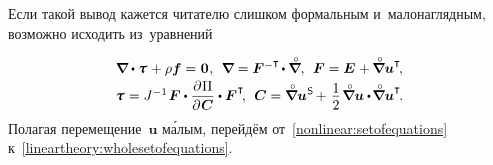 \begin{otherlanguage}{russian}

Если такой вывод кажется читателю слишком формальным и~мало\-нагляд\-ным, возможно исходить из~уравнений %

\nopagebreak\vspace{-0.1em}\begin{equation}\label{nonlinear:setofequations}
\begin{array}{c}
\boldnabla \dotp \mathboldtau \hspace{0.15ex} + \rho \bm{f} = \hspace{0.1ex} \bm{0} \hspace{0.1ex}, \:\:
\boldnabla = \bm{F}^{-\T} \hspace{-0.2ex} \dotp \boldnablacircled , \:\:
\bm{F} = \bm{E} \hspace{0.1ex} + \hspace{-0.1ex} \boldnablacircled {\bm{u}}^{\T} \hspace{-0.3ex}, \\[0.2em]
\mathboldtau \hspace{0.1ex} = J^{-1} \hspace{0.2ex} \bm{F} \dotp \displaystyle \frac{\partial\hspace{0.1ex} \Pi}{\partial\hspace{0.1ex} \bm{C}} \dotp \bm{F}^{\hspace{0.1ex}\T} \hspace{-0.4ex}, \:\:
\bm{C} = \boldnablacircled {\bm{u}}^{\hspace{0.1ex}\mathsf{S}} \hspace{-0.2ex} + \hspace{0.2ex} \displaystyle \onehalf \hspace{0.2ex} \boldnablacircled \bm{u} \dotp \hspace{-0.25ex} \boldnablacircled \bm{u}^{\T} \hspace{-0.25ex}.
\end{array}
\vspace{0.12em}\end{equation}
Полагая перемещение~$\bm{u}$ м\'{а}лым, перейдём от~\eqref{nonlinear:setofequations} к~\eqref{lineartheory:wholesetofequations}.


\end{otherlanguage}
